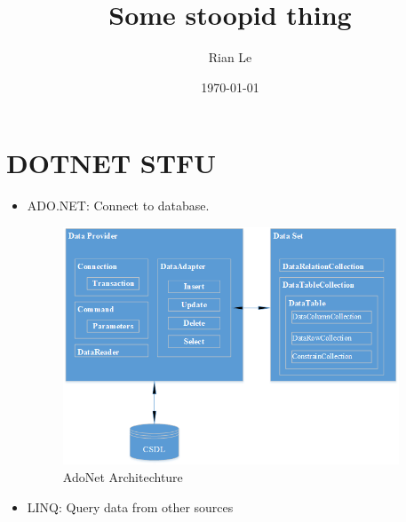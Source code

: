 \documentclass{article}
\title{Some stoopid thing}
\author{Rian Le}
\date{\today}
\begin{document}
    \maketitle

    \section{DOTNET STFU}
    \begin{itemize}
        \item ADO.NET: Connect to database.
        \begin{figure}[htp]
            \centering
            \includegraphics[width=10cm]{AdoNet-01.png}
            \caption{AdoNet Architechture}
        \end{figure}
        \item LINQ: Query data from other sources 
    \end{itemize}
\end{document}
